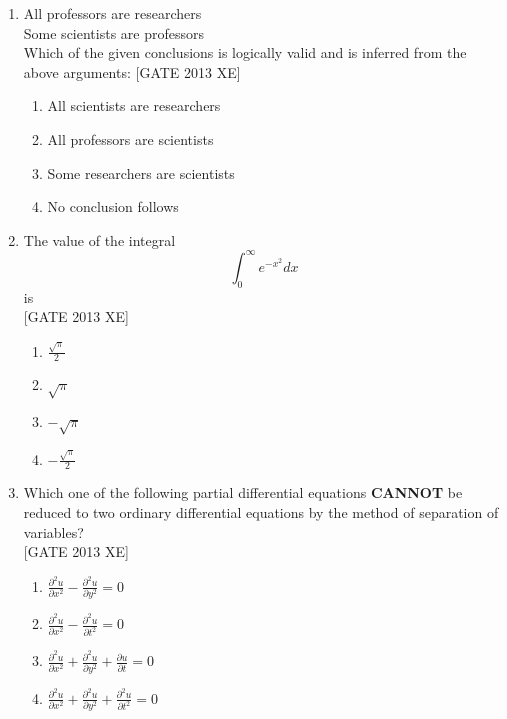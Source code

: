 \documentclass[journal,12pt,onecolumn]{IEEEtran}
\theoremstyle{remark}
\begin{document}
\begin{enumerate}
    \item All professors are researchers\\
    Some scientists are professors\\
    Which of the given conclusions is logically valid and is inferred from the above arguments: \hfill[GATE 2013 XE]
    \begin{multicols}{2}
    \begin{enumerate}
        \item All scientists are researchers
        \item All professors are scientists
        \item Some researchers are scientists
        \item No conclusion follows
    \end{enumerate}
    \end{multicols}
    \item The value of the integral 
$$
\int_0^{\infty} e^{-x^2} dx
$$ 
is \\ \hfill[GATE 2013 XE]

\begin{multicols}{4}
\begin{enumerate}
\item $\frac{\sqrt{\pi}}{2}$ 
\item $\sqrt{\pi}$ 
\item $-\sqrt{\pi}$ 
\item $-\frac{\sqrt{\pi}}{2}$
\end{enumerate}
\end{multicols}

\item Which one of the following partial differential equations \textbf{CANNOT} be reduced to two ordinary differential equations by the method of separation of variables? \\ \hfill[GATE 2013 XE]

\begin{multicols}{4}
\begin{enumerate}
\item 
$
\frac{\partial^2 u}{\partial x^2} - \frac{\partial^2 u}{\partial y^2} = 0$
\item 
$
\frac{\partial^2 u}{\partial x^2} - \frac{\partial^2 u}{\partial t^2} = 0
$
\item 
$
\frac{\partial^2 u}{\partial x^2} + \frac{\partial^2 u}{\partial y^2} + \frac{\partial u}{\partial t} = 0
$
\item 
$
\frac{\partial^2 u}{\partial x^2} + \frac{\partial^2 u}{\partial y^2} + \frac{\partial^2 u}{\partial t^2} = 0
$
\end{enumerate}
\end{multicols}


\end{enumerate}
\end{document}
